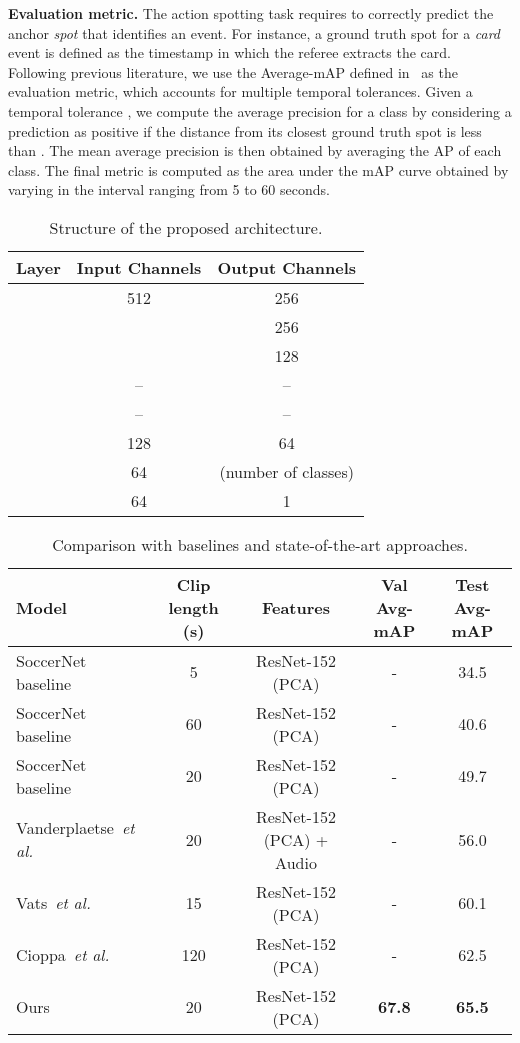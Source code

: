 \documentclass[a4paper,conference]{IEEEtran}
\newcommand{\tit}[1]{\smallbreak\noindent\textbf{#1.}}
\def \etal {\emph{et al.}}
\begin{document}
\tit{Evaluation metric}
The action spotting task requires to correctly predict the anchor \textit{spot} that identifies an event. For instance, a ground truth spot for a \textit{card} event is defined as the timestamp in which the referee extracts the card. Following previous literature, we use the Average-mAP defined in~\cite{giancola2018soccernet} as the evaluation metric, which accounts for multiple temporal tolerances. 
Given a temporal tolerance , we compute the average precision for a class by considering a prediction as positive if the distance from its closest ground truth spot is less than . The mean average precision is then obtained by averaging the AP of each class. The final metric is computed as the area under the mAP curve obtained by varying  in the interval ranging from 5 to 60 seconds.
 
\begin{table}[t]
\centering
\caption{Structure of the proposed architecture.}
\begin{tabular}{ccc}
\toprule 
Layer & Input Channels & Output Channels \\
\midrule
 & 512 & 256 \\
 &  & 256 \\
 &  & 128 \\
 & -- & -- \\
 & -- & -- \\
 & 128 & 64 \\
 & 64 &  (number of classes) \\
 & 64 & 1 \\
\bottomrule
\end{tabular}
\label{tab:channels}
\end{table}

\begin{table*}[t]
\centering
\caption{Comparison with baselines and state-of-the-art approaches.}
\begin{tabular}{lcccc}
\toprule 
Model & Clip length (s) & Features & Val Avg-mAP & Test Avg-mAP \\
\midrule
SoccerNet baseline~\cite{giancola2018soccernet} & 5 & ResNet-152 (PCA) & - & 34.5 \\
SoccerNet baseline~\cite{giancola2018soccernet} & 60 & ResNet-152 (PCA) & - & 40.6 \\
SoccerNet baseline~\cite{giancola2018soccernet} & 20 & ResNet-152 (PCA) & - & 49.7 \\
Vanderplaetse~\etal~\cite{vanderplaetse2020improved} & 20 & ResNet-152 (PCA) + Audio & - & 56.0 \\
Vats~\etal~\cite{vats2020event} & 15 & ResNet-152 (PCA) & - & 60.1 \\
Cioppa~\etal~\cite{cioppa2020context} & 120 & ResNet-152 (PCA) & - & 62.5 \\
\midrule
Ours & 20 & ResNet-152 (PCA) & \textbf{67.8} & \textbf{65.5} \\
\bottomrule
\end{tabular}
\label{tab:sota}
\end{table*}
\end{document}
